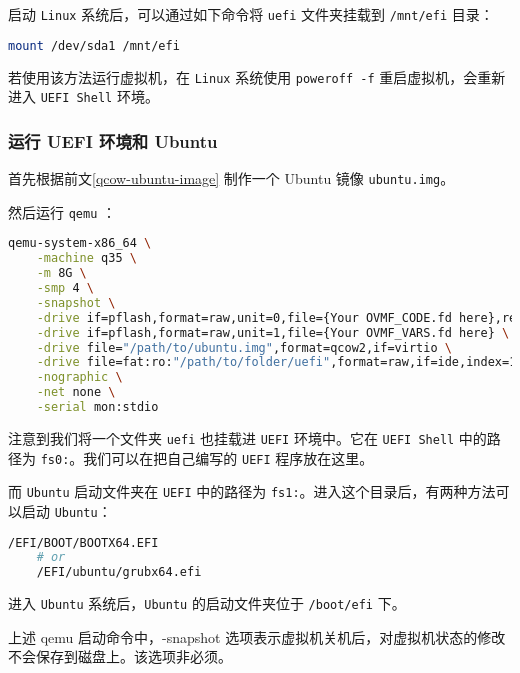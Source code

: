 启动 \texttt{Linux} 系统后，可以通过如下命令将 \texttt{uefi} 文件夹挂载到 \texttt{/mnt/efi} 目录：

\begin{lstlisting}[language=bash]
    mount /dev/sda1 /mnt/efi
\end{lstlisting}

若使用该方法运行虚拟机，在 \texttt{Linux} 系统使用 \texttt{poweroff -f} 重启虚拟机，会重新进入 \texttt{UEFI Shell} 环境。

\subsubsection{运行 UEFI 环境和 Ubuntu}

首先根据前文\ref{qcow-ubuntu-image} 制作一个 Ubuntu 镜像 \texttt{ubuntu.img}。

然后运行 \texttt{qemu} ：

\begin{lstlisting}[language=bash]
    qemu-system-x86_64 \
    -machine q35 \
    -m 8G \
    -smp 4 \
    -snapshot \
    -drive if=pflash,format=raw,unit=0,file={Your OVMF_CODE.fd here},readonly=on \
    -drive if=pflash,format=raw,unit=1,file={Your OVMF_VARS.fd here} \
    -drive file="/path/to/ubuntu.img",format=qcow2,if=virtio \
    -drive file=fat:ro:"/path/to/folder/uefi",format=raw,if=ide,index=1 \
    -nographic \
    -net none \
    -serial mon:stdio
\end{lstlisting}

注意到我们将一个文件夹 \texttt{uefi} 也挂载进 \texttt{UEFI} 环境中。它在 \texttt{UEFI Shell} 中的路径为 \texttt{fs0:}。我们可以在把自己编写的 \texttt{UEFI} 程序放在这里。

而 \texttt{Ubuntu} 启动文件夹在 \texttt{UEFI} 中的路径为 \texttt{fs1:}。进入这个目录后，有两种方法可以启动 \texttt{Ubuntu}：

\begin{lstlisting}[language=bash]
    /EFI/BOOT/BOOTX64.EFI
    # or
    /EFI/ubuntu/grubx64.efi
\end{lstlisting}

进入 \texttt{Ubuntu} 系统后，\texttt{Ubuntu} 的启动文件夹位于 \texttt{/boot/efi} 下。

\begin{remark}
    上述 qemu 启动命令中，-snapshot 选项表示虚拟机关机后，对虚拟机状态的修改不会保存到磁盘上。该选项非必须。
\end{remark}